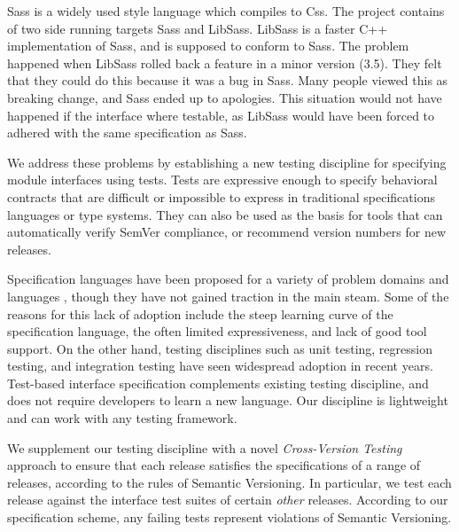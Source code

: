 Sass is a widely used style language which compiles to Css. The project
contains of two side running targets Sass and LibSass. LibSass is a 
faster C++ implementation of Sass, and is supposed to conform to Sass. The
problem happened when LibSass rolled back a feature in a minor version (3.5). 
They felt that they could do this because it was a bug in Sass. Many people 
viewed this as breaking change, and Sass ended up to apologies. This situation
would not have happened if the interface where testable, as LibSass would have
been forced to adhered with the same specification as Sass\cite{libsass}. 
%



We address these problems by establishing a new testing discipline for
specifying module interfaces using tests. Tests are expressive enough
to specify behavioral contracts that are difficult or impossible to
express in traditional specifications languages or type systems. They
can also be used as the basis for tools that can automatically verify
SemVer compliance, or recommend version numbers for new releases.

Specification languages have been proposed for a variety of problem
domains and languages ,
though they have not gained traction in the main steam. 
%
Some of the reasons for this lack of adoption include the steep
learning curve of the specification language, the often limited
expressiveness, and lack of good tool support.
%
On the other hand, testing disciplines such as unit testing,
regression testing, and integration testing have seen widespread
adoption in recent years.
%
Test-based interface specification complements existing testing
discipline, and does not require developers to learn a new
language. Our discipline is lightweight and can work with any testing
framework.

We supplement our testing discipline with a novel \emph{Cross-Version
  Testing} approach to ensure that each release satisfies the
specifications of a range of releases, according to the rules of
Semantic Versioning. In particular, we test each release against the
interface test suites of certain {\em other} releases. According to
our specification scheme, any failing tests represent violations of
Semantic Versioning.

